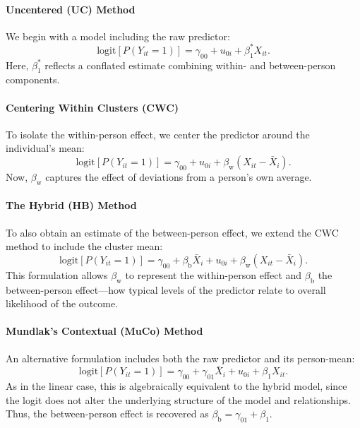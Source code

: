 \documentclass[stu]{apa7}
\begin{document}
\paragraph{Uncentered (UC) Method}

We begin with a model including the raw predictor:
\begin{equation}
    \label{eqn:M1-logit}
\text{logit} \left[ P(Y_{it} = 1) \right] = \gamma_{00} + u_{0i} + \beta_1^* X_{it}.
\end{equation}
Here, \( \beta_1^* \) reflects a conflated estimate combining within- and between-person components.

\paragraph{Centering Within Clusters (CWC)}

To isolate the within-person effect, we center the predictor around the individual’s mean:
\begin{equation}
    \label{eqn:M2-logit}
\text{logit} \left[ P(Y_{it} = 1) \right] = \gamma_{00} + u_{0i} + \beta_\text{w} (X_{it} - \bar{X}_i).
\end{equation}
Now, \( \beta_\text{w} \) captures the effect of deviations from a person’s own average. 

\paragraph{The Hybrid (HB) Method}

To also obtain an estimate of the between-person effect, we extend the CWC method to include the cluster mean:
\begin{equation}
    \label{eqn:M4-logit}
\text{logit} \left[ P(Y_{it} = 1) \right] = \gamma_{00} + \beta_\text{b} \bar{X}_i + u_{0i} + \beta_\text{w} (X_{it} - \bar{X}_i).
\end{equation}
This formulation allows \( \beta_\text{w} \) to represent the within-person effect and \( \beta_\text{b} \) the between-person effect—how typical levels of the predictor relate to overall likelihood of the outcome.

\paragraph{Mundlak's Contextual (MuCo) Method}

An alternative formulation includes both the raw predictor and its person-mean:
\begin{equation}
    \label{eqn:M3-logit}
\text{logit} \left[ P(Y_{it} = 1) \right] = \gamma_{00} + \gamma_{01} \bar{X}_i + u_{0i} + \beta_1 X_{it}.
\end{equation}
As in the linear case, this is algebraically equivalent to the hybrid model, since the logit does not alter the underlying structure of the model and relationships. Thus, the between-person effect is recovered as \( \beta_\text{b} = \gamma_{01} + \beta_1 \).
\end{document}
